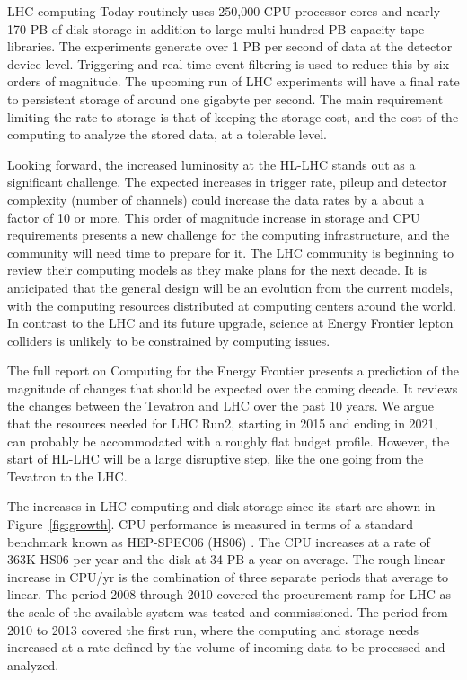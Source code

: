 LHC computing Today routinely uses 250,000 CPU processor cores and nearly 170
PB of disk storage in addition to large multi-hundred PB capacity
tape libraries.  The experiments generate over 1 PB per second of data
at the detector device level. Triggering and real-time event filtering  is
used to reduce this by six orders of magnitude. 
The upcoming run of LHC experiments will have a final rate to persistent
storage of around one gigabyte per second. 
The main requirement limiting the rate to storage is that of keeping 
the storage cost, and the  cost of the computing to analyze
the stored data, at a tolerable level.

Looking forward, the increased luminosity at the
HL-LHC stands out as a significant challenge. 
The expected increases in trigger rate, pileup
and detector complexity (number of channels) could increase the data rates by
a about a factor of 10 or more.   This order of magnitude increase in storage
and CPU requirements presents a new challenge for the computing infrastructure,
and the community will need time to prepare for it. The LHC community is
beginning to review their computing models as they make plans for the next
decade.  It is anticipated that the general design will be an evolution from
the current models, with the computing resources distributed at computing
centers around the world.
In contrast to the LHC and its future upgrade, science at Energy Frontier 
lepton colliders is unlikely to be constrained by computing issues.  

The full report on Computing for the Energy Frontier presents a  prediction 
of the magnitude of changes that should be expected over the coming decade. 
It reviews  the changes between the Tevatron and LHC over the past 10 years. 
We argue
that the resources needed for LHC Run2, starting in 2015 and ending
in 2021, can probably be
accommodated with a roughly flat budget profile. However, the start of HL-LHC
will be a large disruptive step, like the one going from the Tevatron to the
LHC.

The increases in LHC computing and disk storage since its start are shown in
Figure~\ref{fig:growth}.  CPU performance is measured in terms of a standard
benchmark known as HEP-SPEC06 (HS06) \cite{HS06}.
The CPU increases at a rate of 363K HS06 per year and
the disk at 34 PB a year on average.  The rough linear increase in CPU/yr
is the combination of three separate periods that average to linear.  The period
2008 through 2010 covered the procurement ramp for LHC as the scale of the
available system was tested and commissioned. The period from 2010 to 2013 covered
the first run, 
where the computing and storage needs increased at a rate defined by 
the volume of incoming data to be processed and analyzed.

